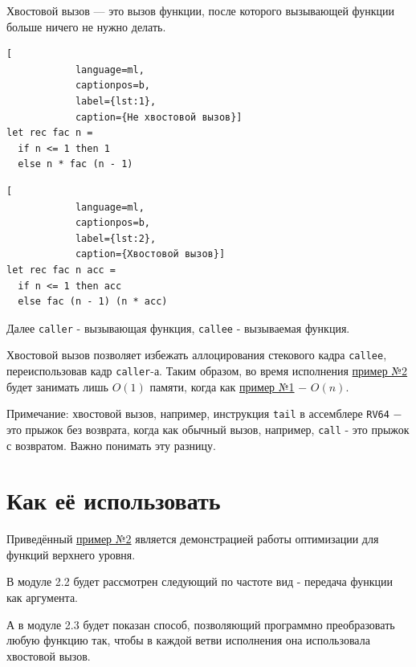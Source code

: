 
	Хвостовой вызов — это вызов функции, после которого вызывающей функции больше ничего не нужно делать.
	
	\noindent
		\begin{minipage}[t]{0.48\textwidth}
		\begin{lstlisting}[
			language=ml,
			captionpos=b,
			label={lst:1},
			caption={Не хвостовой вызов}]
let rec fac n =
  if n <= 1 then 1
  else n * fac (n - 1)
		\end{lstlisting}
	\end{minipage}
	\hfill
	\begin{minipage}[t]{0.48\textwidth}
		\begin{lstlisting}[
			language=ml,
			captionpos=b,
			label={lst:2},
			caption={Хвостовой вызов}]
let rec fac n acc =
  if n <= 1 then acc
  else fac (n - 1) (n * acc)
		\end{lstlisting}
	\end{minipage}

	Далее \texttt{caller} - вызывающая функция, \texttt{callee} - вызываемая функция.
	
	Хвостовой вызов позволяет избежать аллоцирования стекового кадра \texttt{callee}, переиспользовав кадр \texttt{caller}-а. Таким образом, во время исполнения \hyperref[lst:2]{пример №2} будет занимать лишь $O(1)$ памяти, когда как \hyperref[lst:1]{пример №1} $-$ $O(n)$.
	
	Примечание: хвостовой вызов, например, инструкция \texttt{tail} в ассемблере \texttt{RV64} $-$ это прыжок без возврата, когда как обычный вызов, например, \texttt{call} - это прыжок с возвратом. Важно понимать эту разницу.
	

\section{Как её использовать}

Приведённый \hyperref[lst:2]{пример №2} является демонстрацией работы оптимизации для функций верхнего уровня.

В модуле 2.2 будет рассмотрен следующий по частоте вид - передача функции как аргумента.

А в модуле 2.3 будет показан способ, позволяющий программно преобразовать любую функцию так, чтобы в каждой ветви исполнения она использовала хвостовой вызов.

